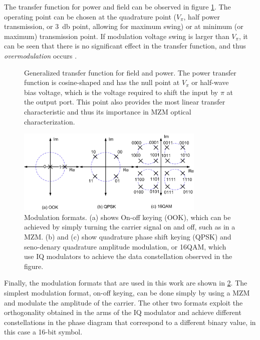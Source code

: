 The transfer function for power and field can be observed in figure \ref{fig:TF}. The operating point can be chosen at the quadrature point ($V_\pi$, half power transmission, or \SI{3}{\decibel} point, allowing for maximum swing) or at minimum (or maximum) transmission point. If modulation voltage swing is larger than $V_\pi$, it can be seen that there is no significant effect in the transfer function, and thus \emph{overmodulation} occurs \cite{SaeckingerMZM09}. 
\begin{figure}[!ht]
\centering
  
  \caption{Generalized transfer function for field and power. The power transfer function is cosine-shaped and has the null point at $V_\pi$ or half-wave bias voltage, which is the voltage required to shift the input by $\pi$ at the output port. This point also provides the most linear transfer characteristic and thus its importance in MZM optical characterization.}
  \label{fig:TF}
\end{figure}

\begin{figure}[!ht]
\centering
  \includegraphics[width=0.8\textwidth]{visio/mod_formats}
  \caption{Modulation formats. (a) shows On-off keying (OOK), which can be achieved by simply turning the carrier signal on and off, such as in a MZM. (b) and (c) show quadrature phase shift keying (QPSK) and seno-denary quadrature amplitude modulation, or 16QAM, which use IQ modulators to achieve the data constellation observed in the figure.}
  \label{fig:mod}
\end{figure}

Finally, the modulation formats that are used in this work are shown in \ref{fig:mod}. The simplest modulation format, on-off keying, can be done simply by using a MZM and modulate the amplitude of the carrier. The other two formats exploit the orthogonality obtained in the arms of the IQ modulator and achieve different constellations in the phase diagram that correspond to a different binary value, in this case a 16-bit symbol. 

